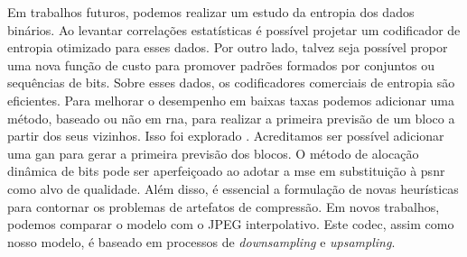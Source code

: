 Em trabalhos futuros, podemos realizar um estudo da entropia dos dados binários. Ao levantar correlações estatísticas é possível projetar um codificador de entropia otimizado para esses dados. 
Por outro lado, talvez seja possível propor uma nova função de custo para promover padrões formados por conjuntos ou sequências de bits. Sobre esses dados, os codificadores comerciais de entropia são eficientes.
Para melhorar o desempenho em baixas taxas podemos adicionar uma método, baseado ou não em \acrshort{rna}, para realizar a primeira previsão de um bloco a partir dos seus vizinhos. Isso foi explorado \cite{SpatiallyAdaptive2018Minnen}. Acreditamos ser possível adicionar uma \acrshort{gan} para gerar a primeira previsão dos blocos.
O método de alocação dinâmica de bits pode ser aperfeiçoado ao adotar a \acrshort{mse} em substituição à \acrshort{psnr} como alvo de qualidade. Além disso, é essencial a formulação de novas heurísticas para contornar os problemas de artefatos de compressão.  
Em novos trabalhos, podemos comparar o modelo com o JPEG interpolativo. Este \acrshort{codec}, assim como nosso modelo, é baseado em processos de \textit{downsampling} e \textit{upsampling}. 

